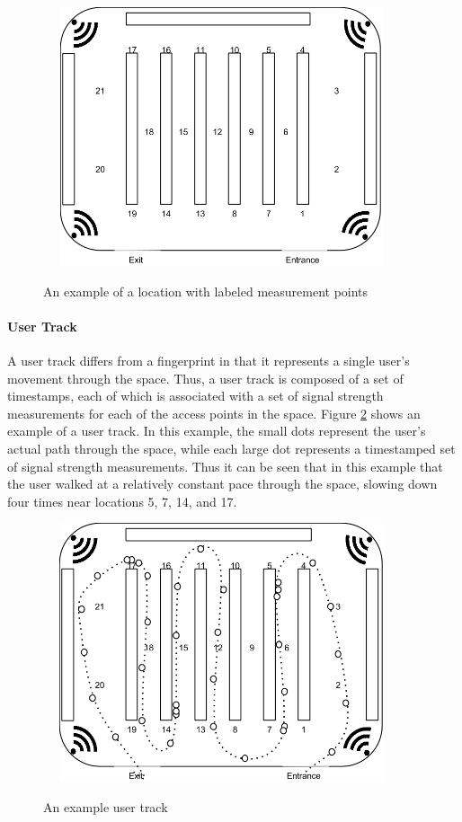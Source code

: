 \begin{figure}[htb] %
	\begin{center}
		\ \includegraphics[width=4in,height=3in]{ExampleLocation.png}
		\caption{An example of a location with labeled measurement points}
		\label{storeexample}
	\end{center}
\end{figure}

\paragraph{User Track}
A user track differs from a fingerprint in that it represents a single user's movement through the space. Thus, a user track is composed of a set of timestamps, each of which is associated with a set of signal strength measurements for each of the access points in the space. Figure \ref{usertrackexample} shows an example of a user track. In this example, the small dots represent the user's actual path through the space, while each large dot represents a timestamped set of signal strength measurements. Thus it can be seen that in this example that the user walked at a relatively constant pace through the space, slowing down four times near locations 5, 7, 14, and 17.


\begin{figure}[htb] %
	\begin{center}
		\ \includegraphics[width=4in,height=3in]{ExampleUserTrack.png}
		\caption{An example user track}
		\label{usertrackexample}
	\end{center}
\end{figure}


